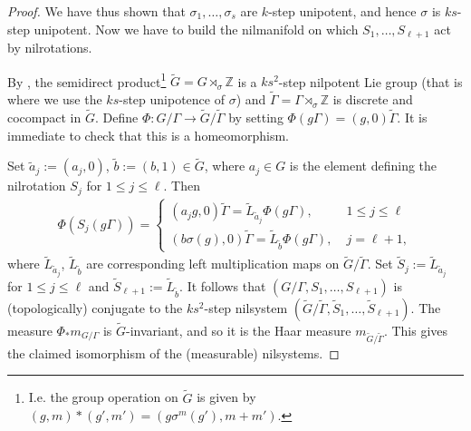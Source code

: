 \documentclass[11pt]{amsart}
\theoremstyle{definition}
\newcommand{\Z}{{\mathbb Z}}
\newcommand{\CX}{{\mathcal X}}
\newcommand{\CY}{{\mathcal Y}}
\newcommand{\1}{{\mathbf{1}}}
\begin{document}
\begin{proof}
We have thus shown that $\sigma_1, \ldots, \sigma_s$ are $k$-step unipotent, and hence $\sigma$ is $ks$-step unipotent. 
Now we have to build the nilmanifold on which $S_1, \ldots, S_{\ell+1}$ act by nilrotations.

By \cite[Chapter 2, Lemma~6]{HK18}, the semidirect product\footnote{I.e. the group operation on $\tilde{G}$ is given by $(g,m)*(g',m') = (g\sigma^m(g'),m+m').$} $\tilde{G} = G \rtimes_\sigma \Z$ is a $ks^2$-step nilpotent Lie group (that is where we use the $ks$-step unipotence of $\sigma$) and $\tilde{\Gamma} = \Gamma \rtimes_\sigma \Z$ is discrete and cocompact in $\tilde{G}$.  
Define $\Phi\colon G/\Gamma \to \tilde{G}/\tilde{\Gamma}$ by setting $\Phi(g\Gamma) = (g,0)\tilde{\Gamma}$.  
It is immediate to check that this is a homeomorphism. 

Set $\tilde{a}_j :=(a_j,0)$, $\tilde b := (b,1)\in\tilde{G}$, where $a_j\in G$ is the element defining the nilrotation $S_j$ for $1\leq j\leq \ell$. Then 
\begin{align*}
    \Phi(S_j(g\Gamma)) = \begin{cases} (a_j g,0)\tilde{\Gamma} = \tilde L_{\tilde a_j}\Phi(g\Gamma),\; &1\leq j\leq\ell\\
    (b\sigma(g), 0)\tilde{\Gamma} = \tilde L_{\tilde{b}}\Phi(g\Gamma),\; &j=\ell+1,
    \end{cases} 
\end{align*}
where $\tilde L_{\tilde a_j}$,  $\tilde L_{\tilde b}$ are corresponding left multiplication maps on $\tilde G/\tilde\Gamma$. Set $\tilde S_j:= \tilde L_{\tilde a_j}$ for $1\leq j\leq \ell$ and $\tilde S_{\ell+1}:=\tilde L_{\tilde b}$.
It follows that $(G/\Gamma, S_1, \ldots, S_{\ell+1})$ is (topologically) conjugate to the $ks^2$-step nilsystem $(\tilde{G}/\tilde{\Gamma}, \tilde S_1, \ldots, \tilde S_{\ell+1})$. The measure $\Phi_*m_{G/\Gamma}$ is $\tilde{G}$-invariant, and so it is the Haar measure $m_{\tilde{G}/\tilde{\Gamma}}$. This gives the claimed isomorphism of the (measurable) nilsystems. 
\end{proof}
\end{document}
